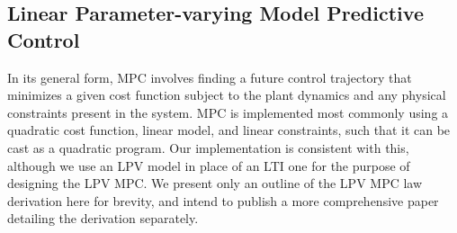 \documentclass[letterpaper, 10 pt, conference]{ieeeconf}  %
\begin{document}
\subsection{Linear Parameter-varying Model Predictive Control}\label{subsec:LPVMPC}

In its general form, MPC involves finding a future control trajectory that minimizes a given cost function subject to the plant dynamics and any physical constraints present in the system. MPC is implemented most commonly using a quadratic cost function, linear model, and linear constraints, such that it can be cast as a quadratic program. Our implementation is consistent with this, although we use an LPV model in place of an LTI one for the purpose of designing the LPV MPC. We present only an outline of the LPV MPC law derivation here for brevity, and intend to publish a more comprehensive paper detailing the derivation separately. 
\end{document}
